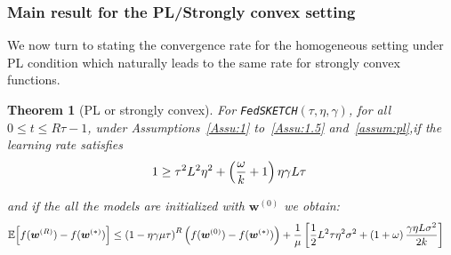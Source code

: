 \documentclass{article} %
\newtheorem{theorem}{Theorem}
\begin{document}
\subsubsection{Main result for the PL/Strongly convex setting}
 
We now turn to stating the convergence rate for the homogeneous setting under PL condition which naturally leads to the same rate for strongly convex functions.
\begin{theorem}[PL or strongly convex]\label{thm:pl-iid}
For \texttt{FedSKETCH}$(\tau, \eta, \gamma)$, for all $0\leq t\leq R\tau-1$,  under Assumptions~\ref{Assu:1} to~\ref{Assu:1.5} and~\ref{assum:pl},if the learning rate satisfies 
\begin{align}\notag
   1\geq {\tau^2 L^2\eta^2}+\left(\frac{\omega}{k}+1\right){\eta\gamma L}{\tau}  \
\end{align}

and if the all the models are initialized with $\boldsymbol{w}^{(0)}$ we obtain:
\begin{align}\notag
        \mathbb{E}\Big[f({\boldsymbol{w}}^{(R)})-f({\boldsymbol{w}}^{(*)})\Big]&\leq \left(1-\eta\gamma{\mu\tau}\right)^R\left(f(\boldsymbol{w}^{(0)})-f(\boldsymbol{w}^{(*)})\right)+\frac{1}{{\mu}}\left[\frac{1}{2} L^2\tau\eta^2\sigma^2+\left(1+\omega\right)\frac{\gamma\eta L\sigma^2}{2k}\right]
\end{align}
\end{theorem}
\end{document}
